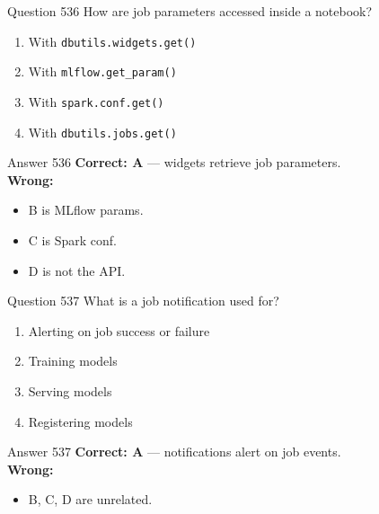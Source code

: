 \documentclass[aspectratio=169,11pt]{beamer}
\begin{document}
	\begin{frame}{Question 536}
		How are job parameters accessed inside a notebook?
		\begin{enumerate}[label=\Alph*.]
			\item With \texttt{dbutils.widgets.get()}
			\item With \texttt{mlflow.get\_param()}
			\item With \texttt{spark.conf.get()}
			\item With \texttt{dbutils.jobs.get()}
		\end{enumerate}
	\end{frame}
	\begin{frame}{Answer 536}
		\textbf{Correct: A} --- widgets retrieve job parameters.\\
		\vspace{0.5em}
		\textbf{Wrong:}
		\begin{itemize}
			\item B is MLflow params.
			\item C is Spark conf.
			\item D is not the API.
		\end{itemize}
	\end{frame}
	
	\begin{frame}{Question 537}
		What is a job notification used for?
		\begin{enumerate}[label=\Alph*.]
			\item Alerting on job success or failure
			\item Training models
			\item Serving models
			\item Registering models
		\end{enumerate}
	\end{frame}
	\begin{frame}{Answer 537}
		\textbf{Correct: A} --- notifications alert on job events.\\
		\vspace{0.5em}
		\textbf{Wrong:}
		\begin{itemize}
			\item B, C, D are unrelated.
		\end{itemize}
	\end{frame}
	
\end{document}

